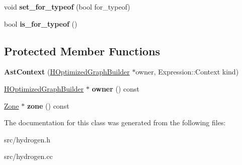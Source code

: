 \begin{DoxyCompactItemize}
\item 
\hypertarget{classv8_1_1internal_1_1_ast_context_ae4193388341ec815f47796b8fe05ae6e}{}void {\bfseries set\+\_\+for\+\_\+typeof} (bool for\+\_\+typeof)\label{classv8_1_1internal_1_1_ast_context_ae4193388341ec815f47796b8fe05ae6e}

\item 
\hypertarget{classv8_1_1internal_1_1_ast_context_a1cc6d5c355706470d71e63c994006029}{}bool {\bfseries is\+\_\+for\+\_\+typeof} ()\label{classv8_1_1internal_1_1_ast_context_a1cc6d5c355706470d71e63c994006029}

\end{DoxyCompactItemize}
\subsection*{Protected Member Functions}
\begin{DoxyCompactItemize}
\item 
\hypertarget{classv8_1_1internal_1_1_ast_context_a2f95ba98943cf65575eb4fde31afe7fb}{}{\bfseries Ast\+Context} (\hyperlink{classv8_1_1internal_1_1_h_optimized_graph_builder}{H\+Optimized\+Graph\+Builder} $\ast$owner, Expression\+::\+Context kind)\label{classv8_1_1internal_1_1_ast_context_a2f95ba98943cf65575eb4fde31afe7fb}

\item 
\hypertarget{classv8_1_1internal_1_1_ast_context_a0faad2f9a48cd43801a1d84e9a0b0988}{}\hyperlink{classv8_1_1internal_1_1_h_optimized_graph_builder}{H\+Optimized\+Graph\+Builder} $\ast$ {\bfseries owner} () const \label{classv8_1_1internal_1_1_ast_context_a0faad2f9a48cd43801a1d84e9a0b0988}

\item 
\hypertarget{classv8_1_1internal_1_1_ast_context_abea1ff333fcef5a2057297c917f1fe9b}{}\hyperlink{classv8_1_1internal_1_1_zone}{Zone} $\ast$ {\bfseries zone} () const \label{classv8_1_1internal_1_1_ast_context_abea1ff333fcef5a2057297c917f1fe9b}

\end{DoxyCompactItemize}


The documentation for this class was generated from the following files\+:\begin{DoxyCompactItemize}
\item 
src/hydrogen.\+h\item 
src/hydrogen.\+cc\end{DoxyCompactItemize}
